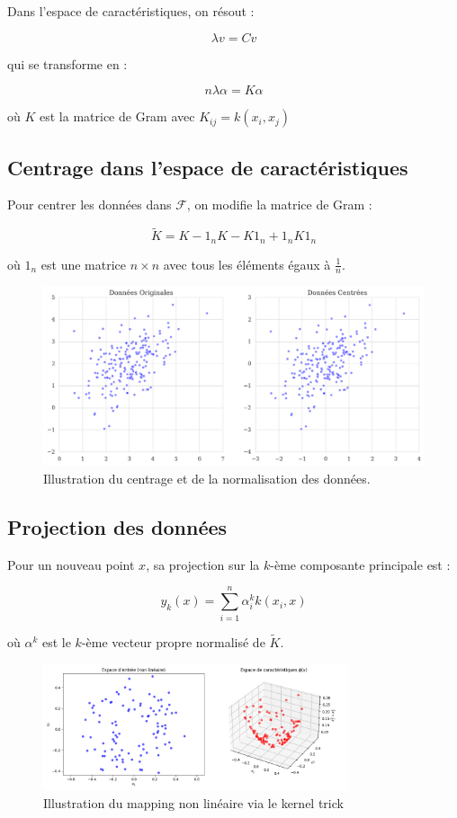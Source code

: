 \documentclass[a4paper,12pt]{report}
\begin{document}
Dans l'espace de caractéristiques, on résout :

\[
\lambda v = Cv
\]

qui se transforme en :

\[
n\lambda \alpha = K\alpha
\]

où $K$ est la matrice de Gram avec $K_{ij} = k(x_i,x_j)$
\subsection{Centrage dans l'espace de caractéristiques}

Pour centrer les données dans $\mathcal{F}$, on modifie la matrice de Gram :

\[
\tilde{K} = K - 1_n K - K 1_n + 1_n K 1_n
\]

où $1_n$ est une matrice $n \times n$ avec tous les éléments égaux à $\frac{1}{n}$.

\begin{figure}[H]
  \centering
  \includegraphics[width=1.1\textwidth]{centrage_normalisation.png}
  \caption{Illustration du centrage et de la normalisation des données.}
  \label{fig:centrage_normalisation_kernel}
\end{figure}
\subsection{Projection des données}

Pour un nouveau point $x$, sa projection sur la $k$-ème composante principale est :

\[
y_k(x) = \sum_{i=1}^n \alpha_i^k k(x_i,x)
\]

où $\alpha^k$ est le $k$-ème vecteur propre normalisé de $\tilde{K}$.

\begin{figure}[H]
  \centering
  \includegraphics[width=0.8\textwidth]{kernel_mapping.png}
  \caption{Illustration du mapping non linéaire via le kernel trick}
  \label{fig:kernel_mapping}
\end{figure}
\end{document}
